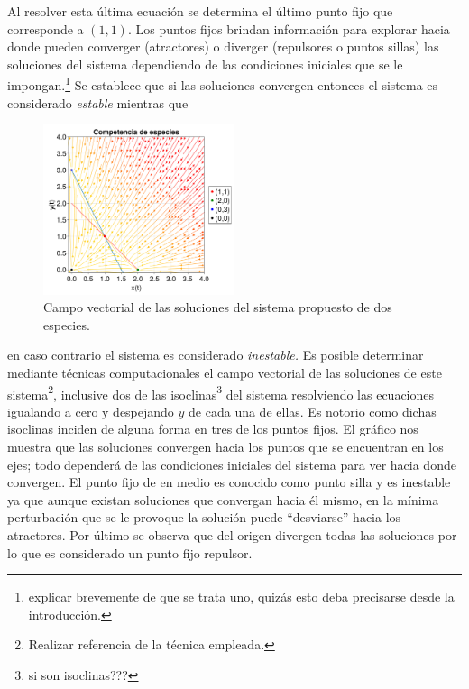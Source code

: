 Al resolver esta última ecuación se determina el último punto fijo que corresponde a $(1,1)$. Los puntos fijos brindan información para explorar hacia donde pueden converger (atractores) o diverger (repulsores o puntos sillas) las soluciones del sistema dependiendo de las condiciones iniciales que se le impongan.\footnote{explicar brevemente de que se trata uno, quizás esto deba precisarse desde la introducción.} Se establece que si las soluciones convergen entonces el sistema es considerado \textit{estable} mientras que 
\begin{figure} \vspace{-30pt} \begin{center}
		\includegraphics[width=0.5\textwidth]{../../Imagenes/Competencia de especies} 
	\end{center} 
	\vspace{-20pt} 
	\caption{Campo vectorial de las soluciones del sistema propuesto de dos especies.} 
	\vspace{-10pt}
	\label{fig:CompetenciaEspecies}
\end{figure} 
en caso contrario el sistema es considerado \textit{inestable.} Es posible determinar mediante técnicas computacionales el campo vectorial de las soluciones de este sistema\footnote{Realizar referencia de la técnica empleada.}, inclusive dos de las isoclinas\footnote{si son isoclinas???} del sistema resolviendo las ecuaciones igualando a cero y despejando $y$ de cada una de ellas. Es notorio como dichas isoclinas inciden de alguna forma en tres de los puntos fijos. El gráfico nos muestra que las soluciones convergen hacia los puntos que se encuentran en los ejes; todo dependerá de las condiciones iniciales del sistema para ver hacia donde convergen. El punto fijo de en medio es conocido como punto silla y es inestable ya que aunque existan soluciones que convergan hacia él mismo, en la mínima perturbación que se le provoque la solución puede ``desviarse'' hacia los atractores. Por último se observa que del origen divergen todas las soluciones por lo que es considerado un punto fijo repulsor.\\
